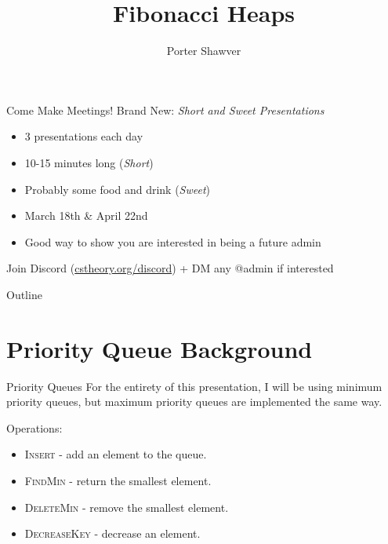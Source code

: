 \documentclass[aspectratio=169]{beamer}
\title{Fibonacci Heaps}
\subtitle{}
\author{Porter Shawver}
\date{}
\begin{document}

\begin{frame}
\titlepage
\end{frame}

\begin{frame}{Come Make Meetings!}
    Brand New: \emph{Short and Sweet Presentations} \pause
    \begin{itemize}
        \item 3 presentations each day
        \item 10-15 minutes long (\emph{Short})
        \item Probably some food and drink (\emph{Sweet})
        \item March 18th \& April 22nd
        \item Good way to show you are interested in being a future admin
    \end{itemize} \pause
    Join Discord (\href{https://www.cstheory.org/discord}{cstheory.org/discord}) + DM any @admin if interested
\end{frame}

\begin{frame}{Outline}
  \tableofcontents
\end{frame}


\section{Priority Queue Background}
\frame{\sectionpage}

\begin{frame}{Priority Queues}
    For the entirety of this presentation, I will be using minimum priority queues, but maximum priority queues are implemented the same way.

    Operations:
    \begin{itemize}
        \item \textsc{Insert} - add an element to the queue.
        \item \textsc{FindMin} - return the smallest element.
        \item \textsc{DeleteMin} - remove the smallest element.
        \item \textsc{DecreaseKey} - decrease an element.
    \end{itemize}
\end{frame}
\end{document}
